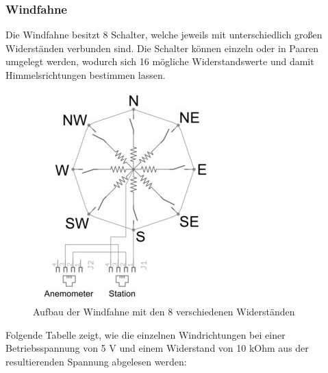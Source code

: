 \documentclass[12pt]{article}
\begin{document}
      \subsubsection{Windfahne}
        Die Windfahne besitzt 8 Schalter, welche jeweils mit unterschiedlich großen Widerständen verbunden sind.
        Die Schalter können einzeln oder in Paaren umgelegt werden, wodurch sich 16 mögliche Widerstandswerte und damit Himmelsrichtungen bestimmen lassen.

        \begin{figure}[H]
          \centering
          \includegraphics[scale=0.6]{Wind_Vane_Switches.jpeg}
          \caption{Aufbau der Windfahne mit den 8 verschiedenen Widerständen\protect\footnotemark[3]}
        \end{figure}


        Folgende Tabelle zeigt, wie die einzelnen Windrichtungen bei einer Betriebsspannung von 5 V und einem Widerstand von 10 kOhm aus der resultierenden Spannung abgelesen werden:
        
\end{document}
